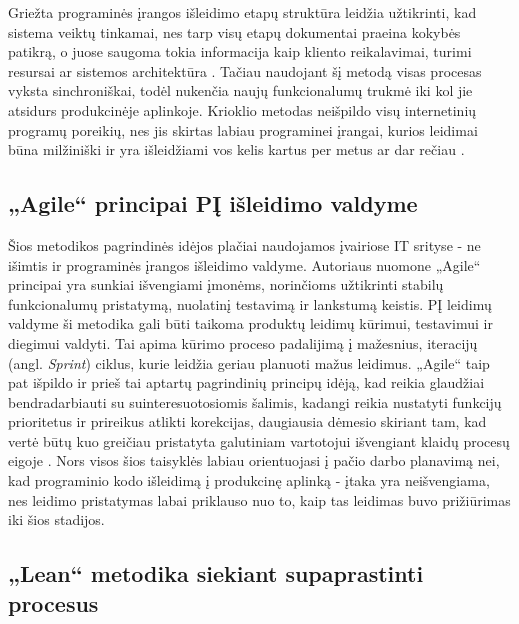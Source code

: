 \documentclass{VUMIFPSkursinis}
\begin{document}
Griežta programinės įrangos išleidimo etapų struktūra leidžia užtikrinti, kad sistema veiktų tinkamai, nes tarp visų etapų dokumentai praeina kokybės patikrą, o juose saugoma tokia informacija kaip kliento reikalavimai, turimi resursai ar sistemos architektūra \cite{SaltKetvirtas}. Tačiau naudojant šį metodą visas procesas vyksta sinchroniškai, todėl nukenčia naujų funkcionalumų trukmė iki kol jie atsidurs produkcinėje aplinkoje. Krioklio metodas neišpildo visų internetinių programų poreikių, nes jis skirtas labiau programinei įrangai, kurios leidimai būna milžiniški ir yra išleidžiami vos kelis kartus per metus ar dar rečiau \cite{SaltTrecias}.

\subsection{„Agile“ principai PĮ išleidimo valdyme}

Šios metodikos pagrindinės idėjos plačiai naudojamos įvairiose IT srityse - ne išimtis ir programinės įrangos išleidimo valdyme. Autoriaus nuomone „Agile“ principai yra sunkiai išvengiami įmonėms, norinčioms užtikrinti stabilų funkcionalumų pristatymą, nuolatinį testavimą ir lankstumą keistis. PĮ leidimų valdyme ši metodika gali būti taikoma produktų leidimų kūrimui, testavimui ir diegimui valdyti. Tai apima kūrimo proceso padalijimą į mažesnius, iteracijų (angl. \textit{Sprint}) ciklus, kurie leidžia geriau planuoti mažus leidimus. „Agile“ taip pat išpildo ir prieš tai aptartų pagrindinių principų idėją, kad reikia glaudžiai bendradarbiauti su suinteresuotosiomis šalimis, kadangi reikia nustatyti funkcijų prioritetus ir prireikus atlikti korekcijas, daugiausia dėmesio skiriant tam, kad vertė būtų kuo greičiau pristatyta galutiniam vartotojui išvengiant klaidų procesų eigoje \cite{SaltTrecias}. Nors visos šios taisyklės labiau orientuojasi į pačio darbo planavimą nei, kad programinio kodo išleidimą į produkcinę aplinką - įtaka yra neišvengiama, nes leidimo pristatymas labai priklauso nuo to, kaip tas leidimas buvo prižiūrimas iki šios stadijos.

\subsection{„Lean“ metodika siekiant supaprastinti procesus}
\end{document}
